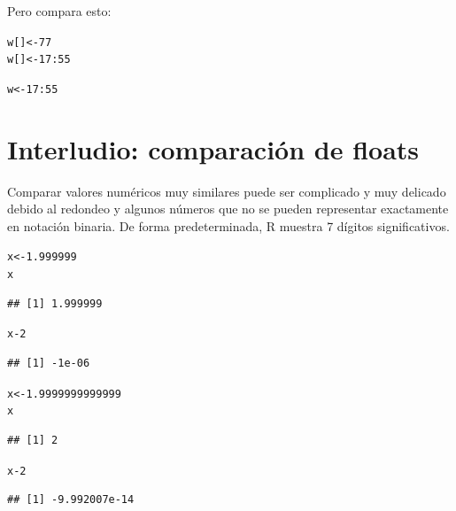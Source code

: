 \documentclass{config/apuntes}\usepackage[]{graphicx}\usepackage[]{xcolor}
\makeatletter
\newcommand{\hlnum}[1]{\textcolor[rgb]{0.686,0.059,0.569}{#1}}%
\newcommand{\hlopt}[1]{\textcolor[rgb]{0,0,0}{#1}}%
\newcommand{\hldef}[1]{\textcolor[rgb]{0.345,0.345,0.345}{#1}}%
\newcommand{\hlkwb}[1]{\textcolor[rgb]{0.69,0.353,0.396}{#1}}%
\newenvironment{kframe}{%
 \def\at@end@of@kframe{}%
 \ifinner\ifhmode%
  \def\at@end@of@kframe{\end{minipage}}%
  \begin{minipage}{\columnwidth}%
 \fi\fi%
 \def\FrameCommand##1{\hskip\@totalleftmargin \hskip-\fboxsep
 \colorbox{shadecolor}{##1}\hskip-\fboxsep
     \hskip-\linewidth \hskip-\@totalleftmargin \hskip\columnwidth}%
 \MakeFramed {\advance\hsize-\width
   \@totalleftmargin\z@ \linewidth\hsize
   \@setminipage}}%
 {\par\unskip\endMakeFramed%
 \at@end@of@kframe}
\newenvironment{knitrout}{}{} %
\makeatother
\begin{document}
Pero compara esto:
\begin{knitrout}
\color{fgcolor}\begin{kframe}
\begin{alltt}
\hldef{w[]} \hlkwb{<-} \hlnum{77}
\hldef{w[]} \hlkwb{<-} \hlnum{17}\hlopt{:}\hlnum{55}
\end{alltt}


{\ttfamily\noindent\color{warningcolor}{\#\# Warning in w[] <- 17:55: número de elementos para sustituir no es un múltiplo de la longitud del reemplazo}}\begin{alltt}
\hldef{w} \hlkwb{<-} \hlnum{17}\hlopt{:}\hlnum{55}
\end{alltt}
\end{kframe}
\end{knitrout}


\section{Interludio: comparación de floats}
Comparar valores numéricos muy similares puede ser complicado y muy delicado debido al redondeo y algunos números que no se pueden representar exactamente en notación binaria. De forma predeterminada, R muestra 7 dígitos significativos.

\begin{knitrout}
\color{fgcolor}\begin{kframe}
\begin{alltt}
\hldef{x}  \hlkwb{<-}  \hlnum{1.999999}
\hldef{x}
\end{alltt}
\begin{verbatim}
## [1] 1.999999
\end{verbatim}
\begin{alltt}
\hldef{x} \hlopt{-} \hlnum{2}
\end{alltt}
\begin{verbatim}
## [1] -1e-06
\end{verbatim}
\begin{alltt}
\hldef{x} \hlkwb{<-} \hlnum{1.9999999999999}
\hldef{x}
\end{alltt}
\begin{verbatim}
## [1] 2
\end{verbatim}
\begin{alltt}
\hldef{x}\hlopt{-}\hlnum{2}
\end{alltt}
\begin{verbatim}
## [1] -9.992007e-14
\end{verbatim}
\end{kframe}
\end{knitrout}
\end{document}
